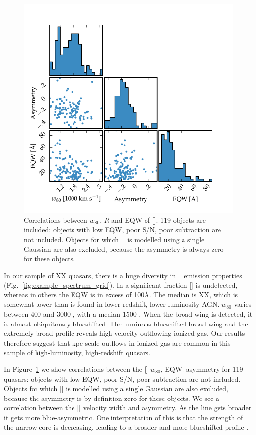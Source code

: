 \begin{figure}
    \includegraphics[width=\columnwidth]{figures/chapter04/parameters_grid.pdf} 
    \caption{Correlations between $w_{80}$, $R$ and EQW of []. 119 objects are included: objects with low \ac{EQW}, poor \ac{S/N}, poor  subtraction are not included. Objects for which [] is modelled using a single Gaussian are also excluded, because the asymmetry is always zero for these objects.}     
    \label{fig:parameters_grid}
\end{figure}

In our sample of XX quasars, there is a huge diversity in [] emission properties (Fig.~\ref{fig:example_spectrum_grid}). 
In a significant fraction [] is undetected, whereas in others the \ac{EQW} is in excess of 100\AA. 
The median is XX, which is somewhat lower than is found in lower-redshift, lower-luminosity AGN. 
$w_{80}$ varies between 400 and 3000 \kms, with a median 1500 \kms.  
When the broad wing is detected, it is almost ubiquitously blueshifted.
The luminous blueshifted broad wing and the extremely broad profile reveals high-velocity outflowing ionized gas. 
Our results therefore suggest that kpc-scale outflows in ionized gas are common in this sample of high-luminosity, high-redshift quasars.

In Figure~\ref{fig:parameters_grid} we show correlations between the [] $w_{80}$, EQW, asymmetry for 119 quasars: objects with low \ac{EQW}, poor \ac{S/N}, poor  subtraction are not included. 
Objects for which [] is modelled using a single Gaussian are also excluded, because the asymmetry is by definition zero for these objects.   
We see a correlation between the [] velocity width and asymmetry. 
As the line gets broader it gets more blue-asymmetric. 
One interpretation of this is that the strength of the narrow core is decreasing, leading to a broader and more blueshifted profile \citep[e.g.][]{shen14}. 

